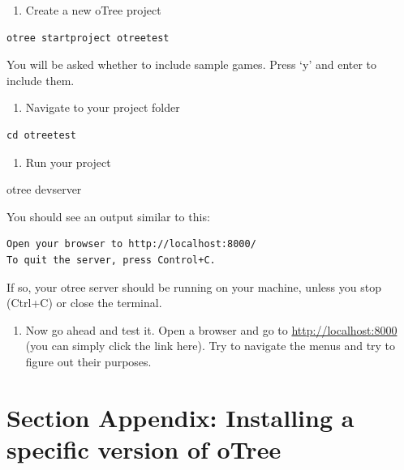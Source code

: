 \documentclass[
  letterpaper,
  DIV=11,
  numbers=noendperiod]{scrreprt}
\newenvironment{Shaded}{\begin{snugshade}}{\end{snugshade}}
\newcommand{\NormalTok}[1]{\textcolor[rgb]{0.00,0.23,0.31}{#1}}
\providecommand{\tightlist}{%
  \setlength{\itemsep}{0pt}\setlength{\parskip}{0pt}}\usepackage{longtable,booktabs,array}
\begin{document}
\begin{enumerate}
\def\labelenumi{\arabic{enumi}.}
\setcounter{enumi}{5}
\tightlist
\item
  Create a new oTree project
\end{enumerate}

\begin{verbatim}
otree startproject otreetest
\end{verbatim}

You will be asked whether to include sample games. Press `y' and enter
to include them.

\begin{enumerate}
\def\labelenumi{\arabic{enumi}.}
\setcounter{enumi}{6}
\tightlist
\item
  Navigate to your project folder
\end{enumerate}

\begin{verbatim}
cd otreetest
\end{verbatim}

\begin{enumerate}
\def\labelenumi{\arabic{enumi}.}
\setcounter{enumi}{7}
\tightlist
\item
  Run your project
\end{enumerate}

\begin{Shaded}
\begin{Highlighting}[]
\NormalTok{otree devserver}
\end{Highlighting}
\end{Shaded}

You should see an output similar to this:

\begin{verbatim}
Open your browser to http://localhost:8000/
To quit the server, press Control+C.
\end{verbatim}

If so, your otree server should be running on your machine, unless you
stop (Ctrl+C) or close the terminal.

\begin{enumerate}
\def\labelenumi{\arabic{enumi}.}
\setcounter{enumi}{8}
\tightlist
\item
  Now go ahead and test it. Open a browser and go to
  \url{http://localhost:8000} (you can simply click the link here). Try
  to navigate the menus and try to figure out their purposes.
\end{enumerate}

\hypertarget{section-appendix-installing-a-specific-version-of-otree}{%
\section{Section Appendix: Installing a specific version of
oTree}\label{section-appendix-installing-a-specific-version-of-otree}}
\end{document}
